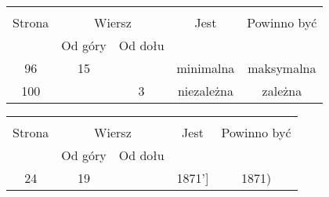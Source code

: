 \documentclass[a4paper,11pt]{article}
\begin{document}
\vspace{\spaceOne}












\begin{center}
  \begin{tabular}{|c|c|c|c|c|}
    \hline
    & \multicolumn{2}{c|}{} & & \\
    Strona & \multicolumn{2}{c|}{Wiersz} & Jest
                              & Powinno być \\ \cline{2-3}
    & Od góry & Od dołu & & \\
    \hline
    96  & 15 & & minimalna & maksymalna \\
    100 & &  3 & niezależna & zależna \\
    \hline
  \end{tabular}
\end{center}

\vspace{\spaceOne}







\begin{center}
  \begin{tabular}{|c|c|c|c|c|}
    \hline
    & \multicolumn{2}{c|}{} & & \\
    Strona & \multicolumn{2}{c|}{Wiersz} & Jest
                              & Powinno być \\ \cline{2-3}
    & Od góry & Od dołu & & \\
    \hline
    24 & 19 & & 1871'] & 1871) \\
    \hline
  \end{tabular}
\end{center}
\end{document}

